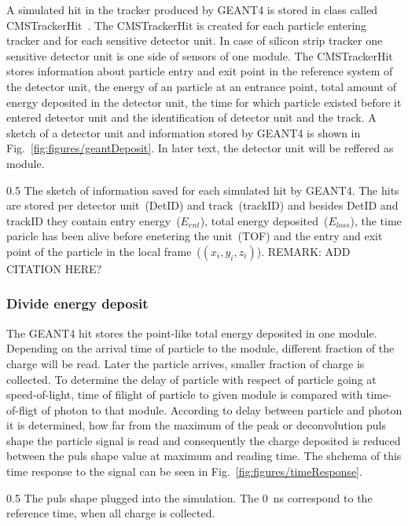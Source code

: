 A simulated hit in the tracker produced by GEANT4 is stored in class called CMSTrackerHit~\cite{Lefebure:1364020}. The CMSTrackerHit is created for each particle entering tracker and for each sensitive detector unit. In case of silicon strip tracker one sensitive detector unit is one side of sensors of one module. The CMSTrackerHit stores information about particle entry and exit point in the reference system of the detector unit, the energy of an particle at an entrance point, total amount of energy deposited in the detector unit, the time for which particle existed before it entered detector unit and the identification of detector unit and the track. A sketch of a detector unit and information stored by GEANT4 is shown in Fig.~\ref{fig:figures/geantDeposit}. In later text, the detector unit will be reffered as module.

                 {0.5}       %
                 { The sketch of information saved for each simulated hit by GEANT4. The hits are stored per detector unit~(DetID) and track~(trackID) and besides DetID and trackID they contain entry energy~($E_{ent}$), total energy deposited~($E_{loss}$), the time paricle has been alive before enetering the unit~(TOF) and the entry and exit point of the particle in the local frame~($(x_{i},y_{i},z_{i})$). REMARK: ADD CITATION HERE?}

\subsubsection{Divide energy deposit}

The GEANT4 hit stores the point-like total energy deposited in one module. Depending on the arrival time of particle to the module, different fraction of the charge will be read. Later the particle arrives, smaller fraction of charge is collected. To determine the delay of particle with respect of particle going at speed-of-light, time of filight of particle to given module is compared with time-of-fligt of photon to that module. According to delay between particle and photon it is determined, how far from the maximum of the  peak or deconvolution puls shape the particle signal is read and consequently the charge deposited is reduced between the puls shape value at maximum and reading time. The shchema of this time response to the signal can be seen in Fig.~\ref{fig:figures/timeResponse}.


                 {0.5}       %
                 { The puls shape plugged into the simulation. The 0~ns correspond to the reference time, when all charge is collected.  }

